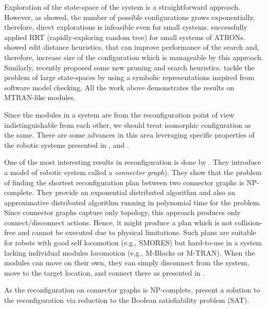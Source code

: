 Exploration of the state-space of the system is a straightforward approach.
However, as \textcite{DBLP:journals/jfr/ChirikjianPE96} showed, the number of
possible configurations grows exponentially, therefore, direct explorations is
infeasible even for small systems. \textcite{DBLP:conf/iros/Brandt06}
successfully applied RRT (rapidly-exploring random tree) for small systems of
ATRONs. \textcite{DBLP:conf/iros/AsadpourASI09} showed edit distance heuristics,
that can improve performance of the search and, therefore, increase size of the
configuration which is manageable by this approach. Similarly,
\textcite{DBLP:journals/ral/KhodrMHBI19} recently proposed some new pruning and
search heuristics. \textcite{DBLP:conf/monterey/BaarirHKR10} tackle the problem
of large state-spaces by using a symbolic representations inspired from software
model checking. All the work above demonstrates the results on MTRAN-like
modules.

Since the modules in a system are from the reconfiguration point of view
indistinguishable from each other, we should treat isomorphic configuration as
the same. There are some advances in this area leveraging specific properties of
the robotic systems presented in \textcite{DBLP:journals/ijrr/ParkCTY08},
\textcite{DBLP:conf/iros/AsadpourASI09} and
\textcite{DBLP:journals/ras/TaheriMAP16}.

One of the most interesting results in reconfiguration is done by
\textcite{DBLP:journals/ras/HouS14}. They introduce a model of robotic system
called a \emph{connector graph}). They show that the problem of finding the
shortest reconfiguration plan between two connector graphs is NP-complete. They
provide an exponential distributed algorithm and also an approximative
distributed algorithm running in polynomial time for the problem. Since
connector graphs capture only topology, this approach produces only
connect/disconnect actions. Hence, it might produce a plan which is not
collision-free and cannot be executed due to physical limitations. Such plans
are suitable for robots with good self locomotion (e.g., SMORES) but hard-to-use
in a system lacking individual modules locomotion (e.g., M-Blocks or M-TRAN).
When the modules can move on their own, they can simply disconnect from the
system, move to the target location, and connect there as presented in
\cite{DBLP:journals/ral/LiuWY19}.

As the reconfiguration on connector graphs is NP-complete,
\textcite{DBLP:journals/pcs/GorbenkoP12} present a solution to the
reconfiguration via reduction to the Boolean satisfiability problem (SAT).

